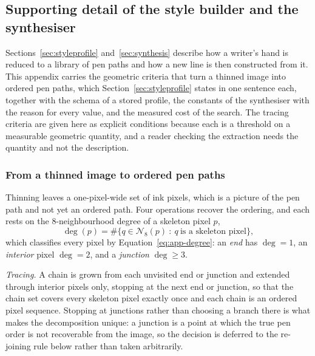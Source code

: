
\subsection{Supporting detail of the style builder and the synthesiser}
\label{sec:app-syn}

Sections~\ref{sec:styleprofile} and~\ref{sec:synthesis} describe how a writer's hand is reduced to a library of pen paths and how a new line is then constructed from it.
This appendix carries the geometric criteria that turn a thinned image into ordered pen paths, which Section~\ref{sec:styleprofile} states in one sentence each, together with the schema of a stored profile, the constants of the synthesiser with the reason for every value, and the measured cost of the search.
The tracing criteria are given here as explicit conditions because each is a threshold on a measurable geometric quantity, and a reader checking the extraction needs the quantity and not the description.

\subsubsection{From a thinned image to ordered pen paths}
\label{sec:app-syn-trace}

Thinning leaves a one-pixel-wide set of ink pixels, which is a picture of the pen path and not yet an ordered path.
Four operations recover the ordering, and each rests on the 8-neighbourhood degree of a skeleton pixel $p$,
\begin{equation}
\deg(p)=\#\bigl\{q\in\mathcal N_8(p)\ :\ q\ \text{is a skeleton pixel}\bigr\},
\label{eq:app-degree}
\end{equation}
which classifies every pixel by Equation~\ref{eq:app-degree}: an \emph{end} has $\deg=1$, an \emph{interior} pixel $\deg=2$, and a \emph{junction} $\deg\ge3$.

\emph{Tracing.}
A chain is grown from each unvisited end or junction and extended through interior pixels only, stopping at the next end or junction, so that the chain set covers every skeleton pixel exactly once and each chain is an ordered pixel sequence.
Stopping at junctions rather than choosing a branch there is what makes the decomposition unique: a junction is a point at which the true pen order is not recoverable from the image, so the decision is deferred to the re-joining rule below rather than taken arbitrarily.

